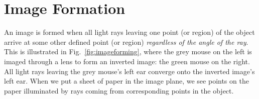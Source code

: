 \documentclass[a4paper]{report}
\begin{document}
%
%
%
%

\section{Image Formation}
An image is formed when all light rays leaving one point (or region) of the object arrive at some other defined point (or region) \textit{regardless of the angle of the ray}. 
This is illustrated in Fig.~\ref{fig:imageforming}, where the grey mouse on the left is imaged through a lens to form an inverted image: the green mouse on the right. 
All light rays leaving the grey mouse's left ear converge onto the inverted image's left ear. 
When we put a sheet of paper in the image plane, we see points on the paper illuminated by rays coming from corresponding points in the object. 
\end{document}
